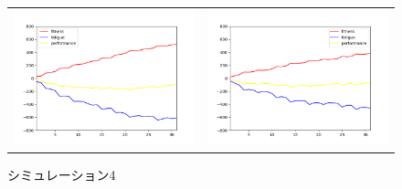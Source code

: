 \documentclass[12pt,fleqn]{jreport}
\begin{document}
\begin{figure}[H]
\begin{tabular}{cc}
\begin{minipage}[t]{0.45\hsize}
      \includegraphics[scale=0.5]{sim3.png}
      \caption{シミュレーション3}
    \end{minipage} &
    \begin{minipage}[t]{0.45\hsize}
      \centering
      \includegraphics[scale=0.5]{sim4.png}
      \caption{シミュレーション4}
    \end{minipage}   \\
  \end{tabular}
\end{figure}
\end{document}
